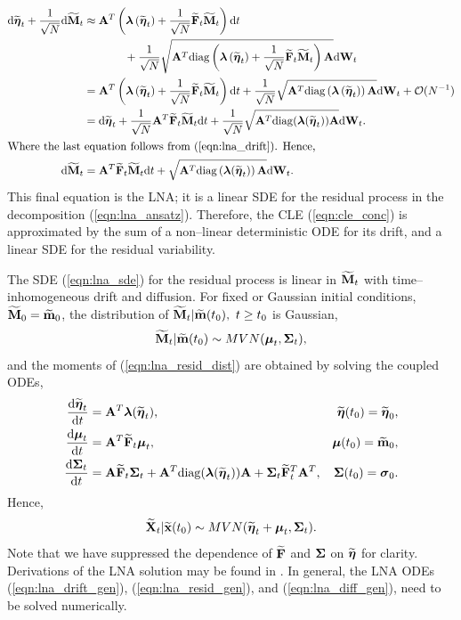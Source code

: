 \begin{align}
\rmd\boetatil_t + \frac{1}{\sqrt{N}}\rmd\bMtil_t &\approx \bA^T\left (\blambda\left (\boetatil_t\right ) + \frac{1}{\sqrt{N}}\bFtil_t\bMtil_t\right )\dt \nonumber \\
&\hspace{0.5in} +\frac{1}{\sqrt{N}}\sqrt{\bA^T\diag\left (\blambda\left (\boetatil_t\right ) + \frac{1}{\sqrt{N}}\bFtil_t\bMtil_t\right )\bA}\rmd\bW_t \nonumber \\
&= \bA^T\left (\blambda\left (\boetatil_t\right ) + \frac{1}{\sqrt{N}}\bFtil_t\bMtil_t\right )\dt + \frac{1}{\sqrt{N}}\sqrt{\bA^T\diag\left (\blambda\left (\boetatil_t\right )\right )\bA}\rmd\bW_t + \mcO(N^{-1}) \nonumber\\
&= \rmd\boetatil_t  + \frac{1}{\sqrt{N}}\bA^T\bFtil_t\bMtil_t\dt + \frac{1}{\sqrt{N}}\sqrt{\bA^T\diag(\blambda(\boetatil_t))\bA}\rmd\bW_t.\nonumber\\
\shortintertext{Where the last equation follows from (\ref{eqn:lna_drift}). Hence,}
\label{eqn:lna_sde}
\rmd\bMtil_t &= \bA^T\bFtil_t\bMtil_t\dt + \sqrt{\bA^T\diag\left (\blambda(\boetatil_t)\right )\bA}\rmd\bW_t.
\end{align}
This final equation is the LNA; it is a linear SDE for the residual process in the decomposition (\ref{eqn:lna_ansatz}). Therefore, the CLE (\ref{eqn:cle_conc}) is approximated by the sum of a non--linear deterministic ODE for its drift, and a linear SDE for the residual variability. 

The SDE (\ref{eqn:lna_sde}) for the residual process is linear in $ \widetilde{\mathbf{M}}_t $ with time--inhomogeneous drift and diffusion. For fixed or Gaussian initial conditions, $ \widetilde{\mathbf{M}}_0 = \widetilde{\mathbf{m}}_0 $, the distribution of $ \widetilde{\mathbf{M}}_t|\widetilde{\mathbf{m}}(t_0),\ t\geq t_0 $ is Gaussian,
\begin{equation}
\label{eqn:lna_resid_dist}
\bMtil_t|\bmtil(t_0) \sim MVN(\bmu_t,\bSigma_t),
\end{equation}
and the moments of (\ref{eqn:lna_resid_dist}) are obtained by solving the coupled ODEs,
\begin{align}
\label{eqn:lna_drift_gen}
\deriv{\boetatil_t}{t} &= \bA^T\blambda(\boetatil_t), & \boetatil(t_0) = \boetatil_0,\\
\label{eqn:lna_resid_gen}
\deriv{\bmu_t}{t} &= \bA^T\bFtil_t\bmu_t, & \bmu(t_0) = \bmtil_0, \\
\label{eqn:lna_diff_gen}
\deriv{\bSigma_t}{t} &= \bA\bFtil_t\bSigma_t + \bA^T\diag(\blambda(\boetatil_t))\bA + \bSigma_t\bFtil_t^T\bA^T, & \bSigma(t_0) = \bsigma_0. 
\end{align}
Hence,
\begin{equation}
\widetilde{\mathbf{X}}_t|\widetilde{\mathbf{x}}(t_0) \sim MVN(\widetilde{\boldsymbol{\eta}}_t + \boldsymbol{\mu}_t,\boldsymbol{\Sigma}_t).
\end{equation}
Note that we have suppressed the dependence of $ \widetilde{\mathbf{F}} $ and $ \boldsymbol{\Sigma} $ on $ \widetilde{\boldsymbol{\eta}} $ for clarity. Derivations of the LNA solution may be found in \cite{vankampen2007stochastic,wallace2012linear,whitaker2016bayesian}. In general, the LNA ODEs (\ref{eqn:lna_drift_gen}), (\ref{eqn:lna_resid_gen}), and (\ref{eqn:lna_diff_gen}), need to be solved numerically. 

